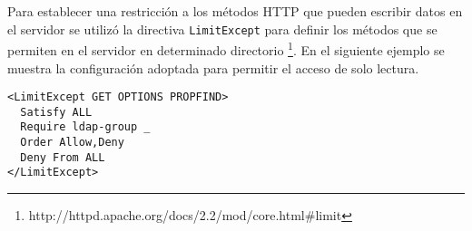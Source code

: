 {
 \linespread{1}
 \begin{table}[H]
 \caption{Clasificaci\'{o}n de m\'{e}todos \textsc{HTTP} de acuerdo al acceso a los datos}{}
 \label{tab:http-methods}
 \noindent{} %
 \end{table}
}

Para establecer una restricci\'{o}n a los m\'{e}todos \textsc{HTTP} que pueden escribir datos en el servidor se utiliz\'{o} la directiva \texttt{LimitExcept} para definir los m\'{e}todos que se permiten en el servidor en determinado directorio \footnote{http://httpd.apache.org/docs/2.2/mod/core.html\#limit}. En el siguiente ejemplo se muestra la configuraci\'{o}n adoptada para permitir el acceso de solo lectura.

{
\scriptsize
\linespread{1}
\begin{verbatim}
<LimitExcept GET OPTIONS PROPFIND>
  Satisfy ALL
  Require ldap-group _
  Order Allow,Deny
  Deny From ALL
</LimitExcept>
\end{verbatim}
}


